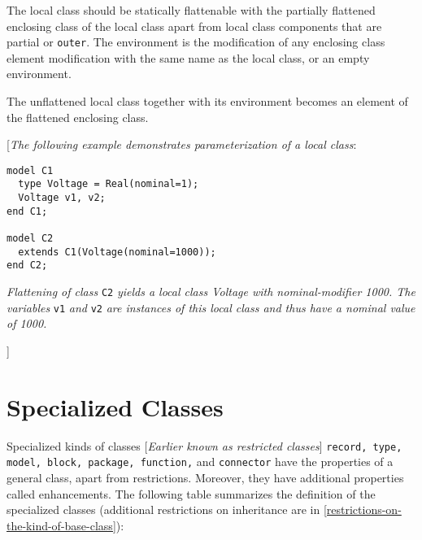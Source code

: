 The local class should be statically flattenable with the partially
flattened enclosing class of the local class apart from local class
components that are partial or \lstinline!outer!. The environment is the
modification of any enclosing class element modification with the same
name as the local class, or an empty environment.

The unflattened local class together with its environment becomes an
element of the flattened enclosing class.

{[}\emph{The following example demonstrates parameterization of a local
class}:
\begin{lstlisting}[language=modelica]
model C1
  type Voltage = Real(nominal=1);
  Voltage v1, v2;
end C1;

model C2
  extends C1(Voltage(nominal=1000));
end C2;
\end{lstlisting}

\emph{Flattening of class} \lstinline!C2! \emph{yields a local class Voltage with
nominal-modifier 1000. The variables} \lstinline!v1! \emph{and} \lstinline!v2! \emph{are
instances of this local class and thus have a nominal value of 1000.}

{]}

\section{Specialized Classes}

Specialized kinds of classes {[}\emph{Earlier known as restricted
classes}{]} \lstinline!record, type, model, block, package, function,! and \lstinline!connector!
have the properties of a general class, apart from restrictions.
Moreover, they have additional properties called enhancements. The
following table summarizes the definition of the specialized classes
(additional restrictions on inheritance are in \autoref{restrictions-on-the-kind-of-base-class}):


